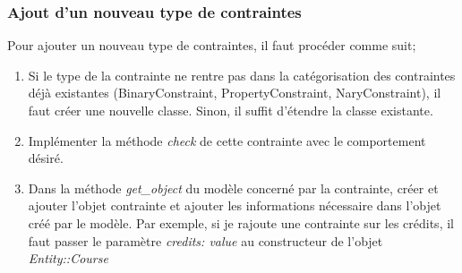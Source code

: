 

\subsubsection{Ajout d'un nouveau type de contraintes}

Pour ajouter un nouveau type de contraintes, il faut procéder comme suit;

\begin{enumerate}
  \item Si le type de la contrainte ne rentre pas dans la catégorisation des contraintes déjà existantes (BinaryConstraint, PropertyConstraint, NaryConstraint), il faut créer une nouvelle classe. Sinon, il suffit d'étendre la classe existante.
  \item Implémenter la méthode \textit{check} de cette contrainte avec le comportement désiré. 
  \item Dans la méthode \textit{get\_object} du modèle concerné par la contrainte, créer et ajouter l'objet contrainte et ajouter les informations nécessaire dans l'objet créé par le modèle. Par exemple, si je rajoute une contrainte sur les crédits, il faut passer le paramètre \textit{credits: value} au constructeur de l'objet \textit{Entity::Course}
\end{enumerate}



